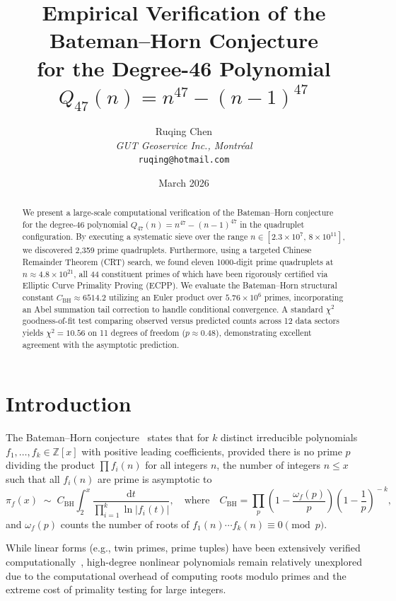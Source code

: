 \documentclass[11pt, a4paper]{article}
\title{Empirical Verification of the Bateman--Horn Conjecture\\for the Degree-46 Polynomial $Q_{47}(n) = n^{47}-(n-1)^{47}$}
\author{Ruqing Chen \\ \small \textit{GUT Geoservice Inc., Montr\'eal} \\ \small \texttt{ruqing@hotmail.com}}
\date{March 2026}
\begin{document}
\maketitle

\begin{abstract}
We present a large-scale computational verification of the Bateman--Horn conjecture for the degree-46 polynomial $Q_{47}(n) = n^{47}-(n-1)^{47}$ in the quadruplet configuration. By executing a systematic sieve over the range $n \in [2.3 \times 10^{7},\, 8 \times 10^{11}]$, we discovered 2{,}359 prime quadruplets. Furthermore, using a targeted Chinese Remainder Theorem (CRT) search, we found eleven 1000-digit prime quadruplets at $n \approx 4.8 \times 10^{21}$, all 44 constituent primes of which have been rigorously certified via Elliptic Curve Primality Proving (ECPP). We evaluate the Bateman--Horn structural constant $C_{\mathrm{BH}} \approx 6514.2$ utilizing an Euler product over $5.76 \times 10^{6}$ primes, incorporating an Abel summation tail correction to handle conditional convergence. A standard $\chi^{2}$ goodness-of-fit test comparing observed versus predicted counts across 12 data sectors yields $\chi^{2} = 10.56$ on 11 degrees of freedom ($p \approx 0.48$), demonstrating excellent agreement with the asymptotic prediction.
\end{abstract}

\section{Introduction}

The Bateman--Horn conjecture~\cite{bateman-horn} states that for $k$ distinct irreducible polynomials $f_{1},\ldots,f_{k} \in \mathbb{Z}[x]$ with positive leading coefficients, provided there is no prime $p$ dividing the product $\prod f_i(n)$ for all integers $n$, the number of integers $n \le x$ such that all $f_{i}(n)$ are prime is asymptotic to
\begin{equation}\label{eq:bh}
\pi_{f}(x) \;\sim\; C_{\mathrm{BH}} \int_{2}^{x} \frac{\mathrm{d}t}{\prod_{i=1}^{k} \ln |f_{i}(t)|}, \quad \text{where} \quad C_{\mathrm{BH}} = \prod_{p}\left(1-\frac{\omega_{f}(p)}{p}\right)\left(1-\frac{1}{p}\right)^{\!-k},
\end{equation}
and $\omega_{f}(p)$ counts the number of roots of $f_{1}(n)\cdots f_{k}(n) \equiv 0 \pmod p$.

While linear forms (e.g., twin primes, prime tuples) have been extensively verified computationally~\cite{crandall-pomerance,oliveira-silva}, high-degree nonlinear polynomials remain relatively unexplored due to the computational overhead of computing roots modulo primes and the extreme cost of primality testing for large integers.
\end{document}
